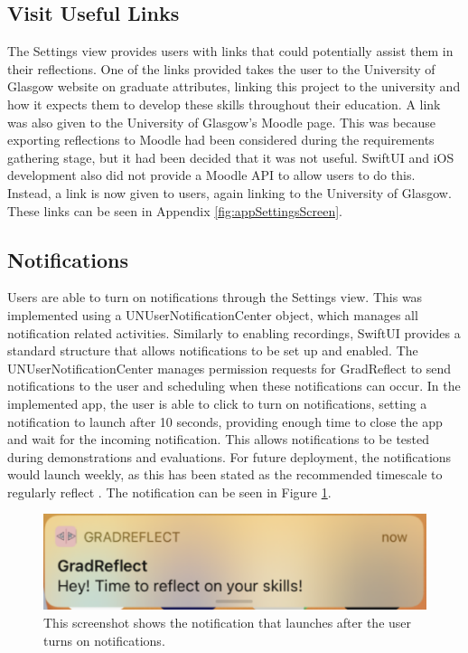 \documentclass{l4proj}
\begin{document}
\subsection{Visit Useful Links}

The Settings view provides users with links that could potentially assist them in their reflections. One of the links provided takes the user to the University of Glasgow website on graduate attributes, linking this project to the university and how it expects them to develop these skills throughout their education. A link was also given to the University of Glasgow's Moodle page. This was because exporting reflections to Moodle had been considered during the requirements gathering stage, but it had been decided that it was not useful. SwiftUI and iOS development also did not provide a Moodle API to allow users to do this. Instead, a link is now given to users, again linking to the University of Glasgow. These links can be seen in Appendix \ref{fig:appSettingsScreen}.

\subsection{Notifications}

Users are able to turn on notifications through the Settings view. This was implemented using a UNUserNotificationCenter object, which manages all notification related activities. Similarly to enabling recordings, SwiftUI provides a standard structure that allows notifications to be set up and enabled. The UNUserNotificationCenter manages permission requests for GradReflect to send notifications to the user and scheduling when these notifications can occur. In the implemented app, the user is able to click to turn on notifications, setting a notification to launch after 10 seconds, providing enough time to close the app and wait for the incoming notification. This allows notifications to be tested during demonstrations and evaluations. For future deployment, the notifications would launch weekly, as this has been stated as the recommended timescale to regularly reflect \citep{bruno_reflective_2018}. The notification can be seen in Figure \ref{fig:Notification}.

\begin{figure}[H]
    \centering
    \includegraphics[scale=0.4]{images/Notification.pdf}    
    \caption{This screenshot shows the notification that launches after the user turns on notifications.}
    \label{fig:Notification} 
\end{figure}
\end{document}
